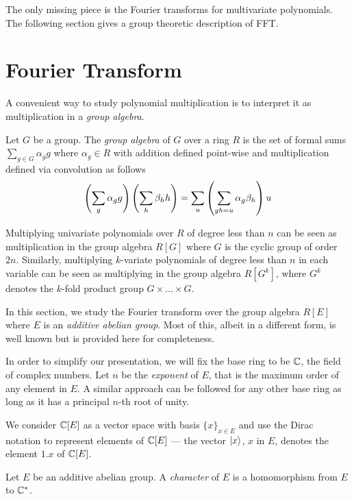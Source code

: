 \documentclass[11pt]{article}
\begin{document}
The only missing piece is the Fourier transforms for multivariate
polynomials. The following section gives a group theoretic description
of FFT.

\section{Fourier Transform}\label{sect-FFT}

A convenient way to study polynomial multiplication is to interpret it
as multiplication in a \emph{group algebra}.

\begin{definition}
  Let $G$ be a group. The \emph{group algebra} of $G$ over a ring $R$
  is the set of formal sums $\sum_{g \in G} \alpha_g g$ where
  $\alpha_g \in R$ with addition defined point-wise and multiplication
  defined via convolution as follows
  $$ \left(\sum_g \alpha_g g\right) \left(\sum_h
  \beta_h h\right) = \sum_{u}\left(\sum_{gh=u} \alpha_g \beta_h\right)u $$
\end{definition}

Multiplying univariate polynomials over $R$ of degree less than $n$
can be seen as multiplication in the group algebra $R[G]$ where $G$ is
the cyclic group of order $2n$. Similarly, multiplying $k$-variate
polynomials of degree less than $n$ in each variable can be seen as
multiplying in the group algebra $R[G^k]$, where $G^k$ denotes the
$k$-fold product group $G\times\ldots \times G$.

In this section, we study the Fourier transform over the group algebra
$R[E]$ where $E$ is an \emph{additive abelian group}. Most of this,
albeit in a different form, is well known but is provided here for
completeness.\cite[Chapter 17]{Igor}

In order to simplify our presentation, we will fix the base ring to be
$\mathbb{C}$, the field of complex numbers. Let $n$ be the \emph{exponent} of
$E$, that is the maximum order of any element in $E$. A similar
approach can be followed for any other base ring as long as it has a
principal $n$-th root of unity.

We consider $\mathbb{C}[E]$ as a vector space with basis $\{ x \}_{x \in E}$
and use the Dirac notation to represent elements of $\mathbb{C}[E]$ --- the
vector $\left| x \right\rangle$, $x$ in $E$, denotes the element $1 . x$ of $\mathbb{C}[E]$.

\begin{definition}[Characters]
Let $E$ be an additive abelian group. A \emph{character} of $E$ is a
homomorphism {}from $E$ to $\mathbb{C}^*$.
\end{definition}
\end{document}
